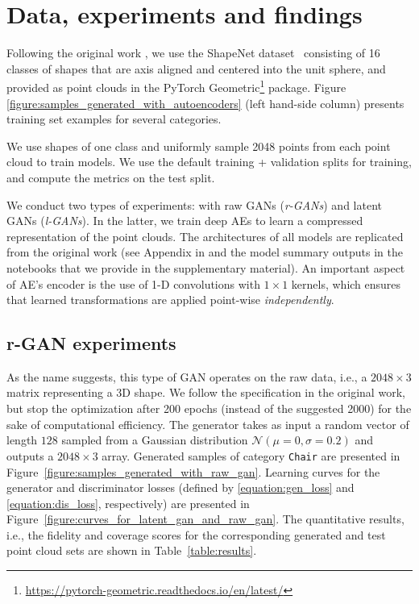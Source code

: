 \documentclass[12pt]{article}
\begin{document}
    \section{Data, experiments and findings}
    \label{sec:data_experiments_findings}

    Following the original work \cite{pmlr-v80-achlioptas18a}, we use the ShapeNet dataset~\cite{arxiv:1512.03012} consisting of 16 classes of shapes
    that are axis aligned and centered into the unit sphere, and provided as point clouds in the PyTorch Geometric\footnote{\url{https://pytorch-geometric.readthedocs.io/en/latest/}} package. Figure \ref{figure:samples_generated_with_autoencoders} (left hand-side column) presents training set examples for several categories.

    We use shapes of one class and uniformly sample 2048 points from each point cloud to train models. We use the default training + validation splits for training, and compute the metrics on the test split.

    We conduct two types of experiments: with raw GANs (\textit{r-GANs}) and latent GANs (\textit{l-GANs}). In the latter, we train deep AEs to learn a compressed representation of the point clouds. The architectures of all models are replicated from the original work (see Appendix in \cite{pmlr-v80-achlioptas18a} and the model summary outputs in the notebooks that we provide in the supplementary material). An important aspect of AE's encoder is the use of 1-D convolutions with $1 \times 1$ kernels, which ensures that learned transformations are applied point-wise \textit{independently}.

    \subsection{r-GAN experiments} As the name suggests, this type of GAN operates on the raw data, i.e., a $2048 \times 3$ matrix representing a 3D shape. We follow the specification in the original work, but stop the optimization after 200 epochs (instead of the suggested 2000) for the sake of computational efficiency. The generator takes as input a random vector of length $128$ sampled from a Gaussian distribution $\mathcal{N}(\mu=0,\sigma=0.2)$ and outputs a $2048 \times 3$ array.
    Generated samples of category \verb|Chair| are presented in Figure~\ref{figure:samples_generated_with_raw_gan}. Learning curves for the generator and discriminator losses (defined by \eqref{equation:gen_loss} and \eqref{equation:dis_loss}, respectively) are presented in Figure~\ref{figure:curves_for_latent_gan_and_raw_gan}.
    The quantitative results, i.e., the fidelity and coverage scores for the corresponding generated and test point cloud sets are shown in Table~\ref{table:results}.
\end{document}
